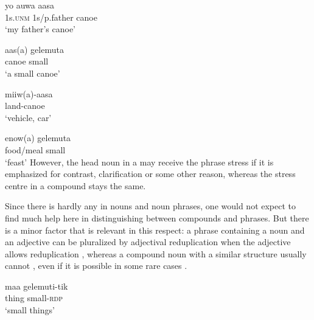 \ea%
\label{ex:3:x29}
\gll yo {\textprimstress}auwa aasa{\upshape\footnotemark[1]{}} \\
1s.\textsc{unm} 1s/p.father canoe\\
\glt`my father's canoe'
\z

\ea%
\label{ex:3:x30}
\gll aas(a) ge{\textprimstress}lemuta \\
canoe small\\
\glt`a small canoe'
\z

\ea%
\label{ex:3:x31}
\gll {\textprimstress}miiw(a)-aasa{\upshape\footnotemark[2]{}} \\
land-canoe\\
\glt`vehicle, car'
\z

\ea%
\label{ex:3:x32}
\gll enow(a) ge{\textprimstress}lemuta{\upshape\footnotemark[3]} \\
food/meal small\\
\glt`feast'
\z
{}
However, the head noun in a  may receive the phrase stress if it is emphasized for contrast, clarification or some other reason, whereas the stress centre in a compound stays the same. %

Since there is hardly any  in nouns and noun phrases, one would not expect to find much help here in distinguishing between compounds and phrases. But there is a minor factor that is relevant in this respect: a phrase containing a noun and an adjective can be pluralized by adjectival reduplication when the adjective allows reduplication , whereas a compound noun with a similar structure usually cannot , even if it is possible in some rare cases . 

\ea%
\label{ex:3:x33}
\gll maa gelemuti-tik \\
thing small-\textsc{rdp}\\
\glt`small things'
\z

\z


